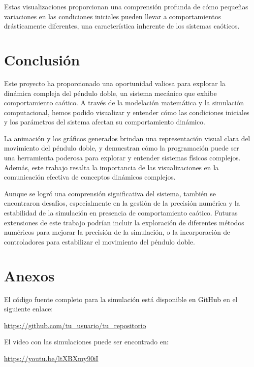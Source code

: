 \documentclass[12pt]{article}
\begin{document}
Estas visualizaciones proporcionan una comprensión profunda de cómo pequeñas variaciones en las condiciones iniciales pueden llevar a comportamientos drásticamente diferentes, una característica inherente de los sistemas caóticos.


\section{Conclusión}

Este proyecto ha proporcionado una oportunidad valiosa para explorar la dinámica compleja del péndulo doble, un sistema mecánico que exhibe comportamiento caótico. A través de la modelación matemática y la simulación computacional, hemos podido visualizar y entender cómo las condiciones iniciales y los parámetros del sistema afectan su comportamiento dinámico.

La animación y los gráficos generados brindan una representación visual clara del movimiento del péndulo doble, y demuestran cómo la programación puede ser una herramienta poderosa para explorar y entender sistemas físicos complejos. Además, este trabajo resalta la importancia de las visualizaciones en la comunicación efectiva de conceptos dinámicos complejos.

Aunque se logró una comprensión significativa del sistema, también se encontraron desafíos, especialmente en la gestión de la precisión numérica y la estabilidad de la simulación en presencia de comportamiento caótico. Futuras extensiones de este trabajo podrían incluir la exploración de diferentes métodos numéricos para mejorar la precisión de la simulación, o la incorporación de controladores para estabilizar el movimiento del péndulo doble.



\section{Anexos}

El código fuente completo para la simulación está disponible en GitHub en el siguiente enlace:
\begin{center}
    \url{https://github.com/tu_usuario/tu_repositorio}
\end{center}

El video con las simulaciones puede ser encontrado en:
\begin{center}
    \url{https://youtu.be/ltXBXmy90iI}
\end{center}
\end{document}
